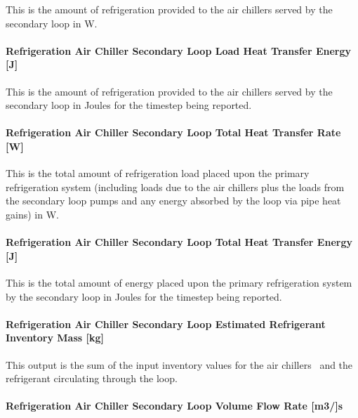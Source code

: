 This is the amount of refrigeration provided to the air chillers served by the secondary loop in W.

\paragraph{Refrigeration Air Chiller Secondary Loop Load Heat Transfer Energy {[}J{]}}\label{refrigeration-air-chiller-secondary-loop-load-heat-transfer-energy-j}

This is the amount of refrigeration provided to the air chillers served by the secondary loop in Joules for the timestep being reported.

\paragraph{Refrigeration Air Chiller Secondary Loop Total Heat Transfer Rate {[}W{]}}\label{refrigeration-air-chiller-secondary-loop-total-heat-transfer-rate-w}

This is the total amount of refrigeration load placed upon the primary refrigeration system (including loads due to the air chillers plus the loads from the secondary loop pumps and any energy absorbed by the loop via pipe heat gains) in W.

\paragraph{Refrigeration Air Chiller Secondary Loop Total Heat Transfer Energy {[}J{]}}\label{refrigeration-air-chiller-secondary-loop-total-heat-transfer-energy-j}

This is the total amount of energy placed upon the primary refrigeration system by the secondary loop in Joules for the timestep being reported.

\paragraph{Refrigeration Air Chiller Secondary Loop Estimated Refrigerant Inventory Mass {[}kg{]}}\label{refrigeration-air-chiller-secondary-loop-estimated-refrigerant-inventory-mass-kg}

This output is the sum of the input inventory values for the air chillers~ and the refrigerant circulating through the loop.

\paragraph{Refrigeration Air Chiller Secondary Loop Volume Flow Rate {[}m3/{]}s}\label{refrigeration-air-chiller-secondary-loop-volume-flow-rate-m3s}

